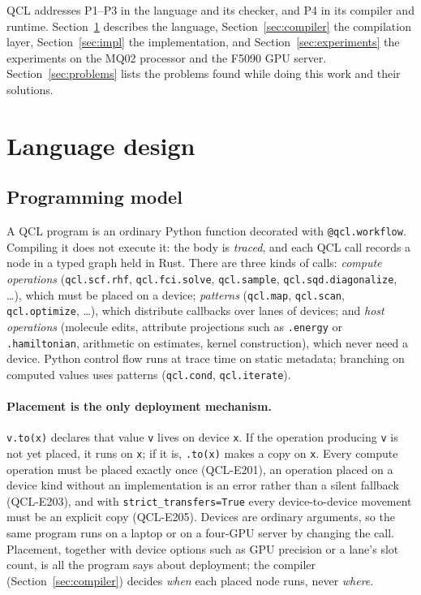 \documentclass[10pt]{article}
\newcommand{\qcl}{QCL}
\newcommand{\code}[1]{\texttt{#1}}
\begin{document}
\qcl{} addresses P1--P3 in the language and its checker, and P4 in its compiler and
runtime. Section~\ref{sec:language} describes the language, Section~\ref{sec:compiler}
the compilation layer, Section~\ref{sec:impl} the implementation, and
Section~\ref{sec:experiments} the experiments on the MQ02 processor and the F5090
GPU server. Section~\ref{sec:problems} lists the problems found while doing this work
and their solutions.

\section{Language design}
\label{sec:language}

\subsection{Programming model}

A \qcl{} program is an ordinary Python function decorated with \code{@qcl.workflow}.
Compiling it does not execute it: the body is \emph{traced}, and each \qcl{} call
records a node in a typed graph held in Rust. There are three kinds of calls:
\emph{compute operations} (\code{qcl.scf.rhf}, \code{qcl.fci.solve}, \code{qcl.sample},
\code{qcl.sqd.diagonalize}, \dots), which must be placed on a device;
\emph{patterns} (\code{qcl.map}, \code{qcl.scan}, \code{qcl.optimize}, \dots), which
distribute callbacks over lanes of devices; and \emph{host operations} (molecule edits,
attribute projections such as \code{.energy} or \code{.hamiltonian}, arithmetic on
estimates, kernel construction), which never need a device. Python control flow runs at
trace time on static metadata; branching on computed values uses patterns
(\code{qcl.cond}, \code{qcl.iterate}).

\paragraph{Placement is the only deployment mechanism.} \code{v.to(x)} declares that
value \code{v} lives on device \code{x}. If the operation producing \code{v} is not yet
placed, it runs on \code{x}; if it is, \code{.to(x)} makes a copy on \code{x}. Every
compute operation must be placed exactly once (QCL-E201), an operation placed on a device
kind without an implementation is an error rather than a silent fallback (QCL-E203), and
with \code{strict\_transfers=True} every device-to-device movement must be an explicit
copy (QCL-E205). Devices are ordinary arguments, so the same program runs on a laptop
or on a four-GPU server by changing the call. Placement, together with device options
such as GPU precision or a lane's slot count, is all the program says about deployment;
the compiler (Section~\ref{sec:compiler}) decides \emph{when} each placed node runs,
never \emph{where}.
\end{document}
